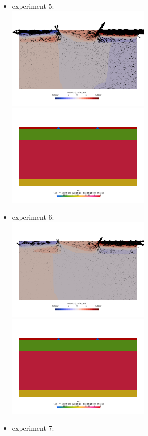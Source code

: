 \newpage
\begin{itemize}
\item experiment 5:\\
\includegraphics[width=7cm]{python_codes/fieldstone_148/results/vels_0004}
\includegraphics[width=7cm]{python_codes/fieldstone_148/results/etas_0004}
\item experiment 6:\\
\includegraphics[width=7cm]{python_codes/fieldstone_148/results/vels_0005}
\includegraphics[width=7cm]{python_codes/fieldstone_148/results/etas_0005}
\item experiment 7:\\

\end{itemize}
